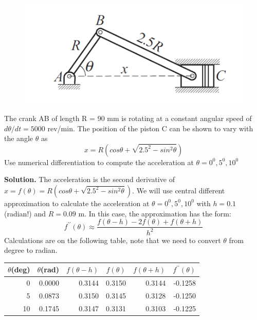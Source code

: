 \begin{exercise}{1} %

\begin{figure}[h]
    \centering
\includegraphics{5-1-12.png}
\end{figure}

The crank AB of length R = 90 mm is rotating at a constant angular speed of $d\theta/dt = 5 000$ rev/min. The position of the piston C can be shown to vary with
the angle $\theta$ as
$$x=R(cos\theta + \sqrt{2.5^2-sin^2\theta})$$
Use numerical differentiation to compute the acceleration at $\theta=0^0, 5^0, 10^0$

\textbf{Solution.} 
The acceleration is the second derivative of $x = f(\theta)= R(cos\theta + \sqrt{2.5^2-sin^2\theta})$. We will use central different approximation to calculate the acceleration at $\theta=0^0, 5^0, 10^0$ with $h=0.1$ (radian!) and $R = 0.09$ m. In this case, the approximation has the form:
$$f^{\prime\prime}(\theta) \approx \frac{f(\theta-h) -2f(\theta) + f(\theta+h)}{h^2}$$
Calculations are on the following table, note that we need to convert $\theta$ from degree to radian.

\begin{table}[h]
\centering
\begin{tabular}{|rrrrrr|}
\hline
\multicolumn{1}{|c}{\textbf{$\theta$(deg)}} & \multicolumn{1}{c}{\textbf{$\theta$(rad)}} & \multicolumn{1}{c}{\textbf{$f(\theta-h)$}} & \multicolumn{1}{c}{\textbf{$f(\theta)$}} & \multicolumn{1}{c}{\textbf{$f(\theta+h)$}} & \multicolumn{1}{c|}{\textbf{$f^{\prime\prime}(\theta)$}} \\ \hline
0 & 0.0000 & 0.3144 & 0.3150 & 0.3144 & -0.1258 \\
5 & 0.0873 & 0.3150 & 0.3145 & 0.3128 & -0.1250 \\
10 & 0.1745 & 0.3147 & 0.3131 & 0.3103 & -0.1225 \\ \hline
\end{tabular}
\end{table}

\end{exercise}

